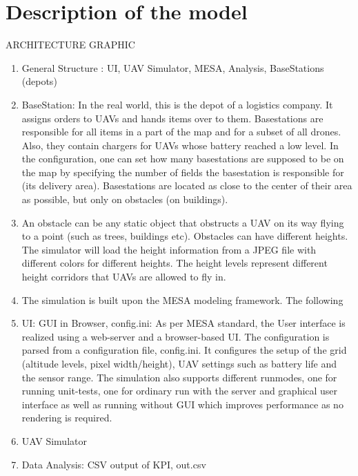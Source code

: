 \section{Description of the model}
ARCHITECTURE GRAPHIC
\begin{enumerate}
	\item General Structure :  UI, UAV Simulator, MESA, Analysis, BaseStations (depots)
	\item BaseStation: In the real world, this is the depot of a logistics company. It assigns orders to UAVs and hands items over to them. Basestations are responsible for all items in a part of the map and for a subset of all drones. Also, they contain chargers for UAVs whose battery reached a low level. In the configuration, one can set how many basestations are supposed to be on the map by specifying the number of fields the basestation is responsible for (its delivery area). Basestations are located as close to the center of their area as possible, but only on obstacles (on buildings).
		\item An obstacle can be any static object that obstructs a UAV on its way flying to a point (such as trees, buildings etc). Obstacles can have different heights. The simulator will load the height information from a JPEG file with different colors for different heights. The height levels represent different height corridors that UAVs are allowed to fly in.
	\item The simulation is built upon the MESA modeling framework. The following 
	\item UI: GUI in Browser, config.ini: As per MESA standard, the User interface is realized using a web-server and a browser-based UI. The configuration is parsed from a configuration file,  config.ini. It configures the setup of the grid (altitude levels, pixel width/height), UAV settings such as battery life and the sensor range. The simulation also supports different runmodes, one for running unit-tests, one for ordinary run with the server and graphical user interface as well as running without GUI which improves performance as no rendering is required.
	\item UAV Simulator
	\item Data Analysis: CSV output of KPI, out.csv
\end{enumerate}

